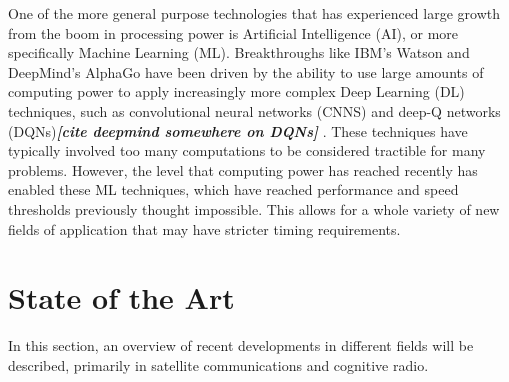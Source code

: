 \par One of the more general purpose technologies that has experienced large growth from the boom in processing power is Artificial Intelligence (AI), or more specifically Machine Learning (ML). Breakthroughs like IBM's Watson and DeepMind's AlphaGo have been driven by the ability to use large amounts of computing power to apply increasingly more complex Deep Learning (DL) techniques, such as convolutional neural networks (CNNS) and deep-Q networks (DQNs)\textit{\textbf{[cite deepmind somewhere on DQNs]}} \cite{paulo_thesis_cite_5}. These techniques have typically involved too many computations to be considered tractible for many problems. However, the level that computing power has reached recently has enabled these ML techniques, which have reached performance and speed thresholds previously thought impossible. This allows for a whole variety of new fields of application that may have stricter timing requirements. 


\section{State of the Art}
\par In this section, an overview of recent developments in different fields will be described, primarily in satellite communications and cognitive radio. 
